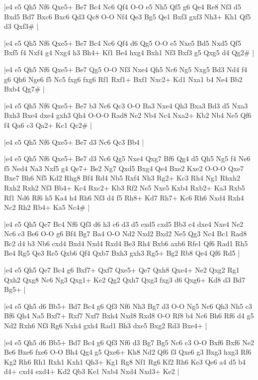 \whitename{}
\blackname{}
\makegametitle
|e4 e5 Qh5 Nf6 Qxe5+ Be7 Bc4 Nc6 Qf4 O-O e5 Nh5 Qf5 g6 Qe4 Re8 Nf3 d5 Bxd5 Bd7 Bxc6 Bxc6 Qd3 Qc8 O-O Nf4 Qe3 Bg5 Qe1 Bxf3 gxf3 Nh3+ Kh1 Qf5 d3 Qxf3\#  |

\whitename{}
\blackname{}
\makegametitle
|e4 e5 Qh5 Nf6 Qxe5+ Be7 Bc4 Nc6 Qf4 d6 Qg5 O-O e5 Nxe5 Bd5 Nxd5 Qf5 Bxf5 f4 Nxf4 g4 Nxg4 h3 Bh4+ Kf1 Be4 hxg4 Bxh1 Nf3 Bxf3 g5 Qxg5 d4 Qg2\#  |

\whitename{}
\blackname{}
\makegametitle
|e4 e5 Qh5 Nf6 Qxe5+ Be7 Qg5 O-O Nf3 Nxe4 Qh5 Nc6 Ng5 Nxg5 Bd3 Nd4 f4 g6 Qh6 Nge6 f5 Nc5 fxg6 fxg6 Rf1 Rxf1+ Bxf1 Nxc2+ Kd1 Nxa1 b4 Ne4 Bb2 Bxb4 Qg7\#  |

\whitename{}
\blackname{}
\makegametitle
|e4 e5 Qh5 Nf6 Qxe5+ Be7 b3 Nc6 Qc3 O-O Ba3 Nxe4 Qh3 Bxa3 Bd3 d5 Nxa3 Bxh3 Bxe4 dxe4 gxh3 Qh4 O-O-O Rad8 Ne2 Nb4 Nc4 Nxa2+ Kb2 Nb4 Ne5 Qf6 f4 Qa6 c3 Qa2+ Kc1 Qc2\#  |

\whitename{}
\blackname{}
\makegametitle
|e4 e5 Qh5 Nf6 Qxe5+ Be7 d3 Nc6 Qc3 Bb4  |

\whitename{}
\blackname{}
\makegametitle
|e4 e5 Qh5 Nf6 Qxe5+ Be7 d3 Nc6 Qg5 Nxe4 Qxg7 Bf6 Qg4 d5 Qh5 Ng5 f4 Ne6 f5 Ned4 Na3 Nxf5 g4 Qe7+ Be2 Ng7 Qxd5 Bxg4 Qe4 Bxe2 Kxe2 O-O-O Qxe7 Bxe7 Bh6 Nf5 Kd2 Rhg8 Bf4 Rd4 Nb5 Rxf4 Nh3 Rg2+ Kc3 Rh4 Ng1 Rhxh2 Rxh2 Rxh2 Nf3 Bb4+ Kc4 Rxc2+ Kb3 Rf2 Ne5 Nxe5 Kxb4 Rxb2+ Ka3 Rxb5 Rf1 Nd6 Rf6 h5 Ka4 h4 Rh6 Nf3 d4 f5 Rh8+ Kd7 Rh7+ Kc6 Rh6 Nxd4 Rxh4 Nc2 Rh2 Rb4+ Ka5 Nc4\#  |

\whitename{}
\blackname{}
\makegametitle
|e4 e5 Qh5 Qe7 Bc4 Nf6 Qf3 d6 h3 c6 d3 d5 exd5 cxd5 Bb3 e4 dxe4 Nxe4 Ne2 Nc6 c3 Be6 O-O g6 Bf4 Bg7 Ba4 O-O Nd2 Nxd2 Bxd2 Ne5 Qg3 Nc4 Bc1 Rad8 Bc2 d4 b3 Nb6 cxd4 Bxd4 Nxd4 Rxd4 Be3 Rh4 Bxb6 axb6 Rfe1 Qf6 Rad1 Rh5 Be4 Rg5 Qe3 Re5 Qxb6 Qf4 Qxb7 Bxh3 gxh3 Rg5+ Bg2 Rb8 Qe4 Qf6 Rd5  |

\whitename{}
\blackname{}
\makegametitle
|e4 e5 Qh5 Qe7 Bc4 g6 Bxf7+ Qxf7 Qxe5+ Qe7 Qxh8 Qxe4+ Ne2 Qxg2 Rg1 Qxh2 Qxg8 Nc6 Ng3 Qxg1+ Ke2 Qg2 Qxh7 Qxg3 fxg3 d6 Qxg6+ Kd8 d3 Bd7 Bg5+  |

\whitename{}
\blackname{}
\makegametitle
|e4 e5 Qh5 d6 Bb5+ Bd7 Bc4 g6 Qf3 Nf6 Nh3 Bg7 d3 O-O Ng5 Nc6 Qh3 Nh5 c3 Bf6 Qh4 Na5 Bxf7+ Rxf7 Nxf7 Bxh4 Nxd8 Rxd8 O-O Rf8 b4 Nc6 Bh6 Rf6 d4 g5 Nd2 Rxh6 Nf3 Rg6 Nxh4 gxh4 Rad1 Bh3 dxe5 Bxg2 Rd3 Bxe4+  |

\whitename{}
\blackname{}
\makegametitle
|e4 e5 Qh5 d6 Bb5+ Bd7 Bc4 g6 Qf3 Nf6 d3 Bg7 Bg5 Nc6 c3 O-O Bxf6 Bxf6 Ne2 Be6 Bxe6 fxe6 O-O Bh4 Qg4 g5 Qxe6+ Kh8 Nd2 Qf6 f3 Qxe6 g3 Bxg3 hxg3 Rf6 Kg2 Rh6 Rh1 Rxh1 Kxh1 Qh3+ Kg1 Rg8 Nf1 Rg6 Kf2 Rh6 Ke3 Qe6 a4 d5 b4 d4+ cxd4 exd4+ Kd2 Qb3 Ke1 Nxb4 Nxd4 Nxd3+ Ke2  |

